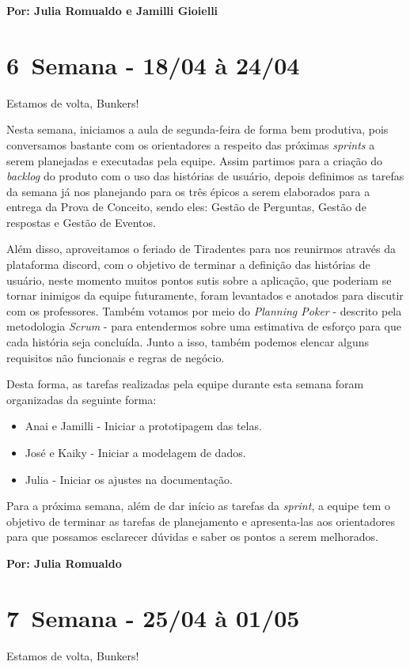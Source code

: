 \textbf{Por: Julia Romualdo e Jamilli Gioielli}

\section{6\textordfeminine \, Semana - 18/04 à 24/04}
Estamos de volta, Bunkers!

Nesta semana, iniciamos a aula de segunda-feira de forma bem produtiva, pois conversamos bastante com os orientadores a respeito das próximas \textsl{sprints} a serem planejadas e executadas pela equipe. Assim partimos para a criação do \textsl{backlog} do produto com o uso das histórias de usuário, depois definimos as tarefas da semana já nos planejando para os três épicos a serem elaborados para a entrega da Prova de Conceito, sendo eles: Gestão de Perguntas, Gestão de respostas e Gestão de Eventos.

Além disso, aproveitamos o feriado de Tiradentes para nos reunirmos através da plataforma \gls{discord}, com o objetivo de terminar a definição das histórias de usuário, neste momento muitos pontos sutis sobre a aplicação, que poderiam se tornar inimigos da equipe futuramente, foram levantados e anotados para discutir com os professores. Também votamos por meio do \textsl{Planning Poker} - descrito pela metodologia \textsl{Scrum} - para entendermos sobre uma estimativa de esforço para que cada história seja concluída. Junto a isso, também podemos elencar alguns requisitos não funcionais e regras de negócio.

Desta forma, as tarefas realizadas pela equipe durante esta semana foram organizadas da seguinte forma:

\begin{itemize}
    \item Anai e Jamilli - Iniciar a prototipagem das telas.
    \item José e Kaiky - Iniciar a modelagem de dados.
    \item Julia - Iniciar os ajustes na documentação.
\end{itemize}

Para a próxima semana, além de dar início as tarefas da \textsl{sprint}, a equipe tem o objetivo de terminar as tarefas de planejamento e apresenta-las aos orientadores para que possamos esclarecer dúvidas e saber os pontos a serem melhorados.

\textbf{Por: Julia Romualdo}

\section{7\textordfeminine \, Semana - 25/04 à 01/05}
Estamos de volta, Bunkers!

